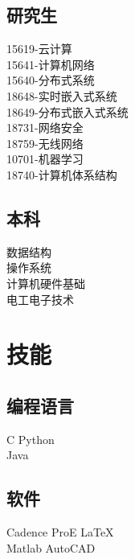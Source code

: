 \documentclass[]{deedy-resume-ch}
\begin{document}
\begin{minipage}[t]{0.33\textwidth}
\subsection{研究生}
15619-云计算 \\
15641-计算机网络 \\
15640-分布式系统\\
18648-实时嵌入式系统\\
18649-分布式嵌入式系统\\
18731-网络安全 \\
18759-无线网络 \\
10701-机器学习 \\
18740-计算机体系结构 \\
\sectionsep

\subsection{本科}
数据结构 \\
操作系统 \\
计算机硬件基础 \\
电工电子技术\\
\sectionsep


\section{技能}
\subsection{编程语言}
C \textbullet{} Python \\
Java\\
\sectionsep

\subsection{软件}
Cadence \textbullet{} ProE \textbullet{} \LaTeX  \\
Matlab \textbullet{} AutoCAD
\sectionsep

%
%

\end{minipage}
\hfill
\end{document}
